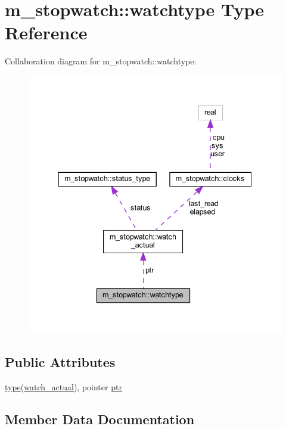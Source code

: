 \hypertarget{structm__stopwatch_1_1watchtype}{}\section{m\+\_\+stopwatch\+:\+:watchtype Type Reference}
\label{structm__stopwatch_1_1watchtype}


Collaboration diagram for m\+\_\+stopwatch\+:\+:watchtype\+:
\nopagebreak
\begin{figure}[H]
\begin{center}
\leavevmode
\includegraphics[width=338pt]{structm__stopwatch_1_1watchtype__coll__graph}
\end{center}
\end{figure}
\subsection*{Public Attributes}
\begin{DoxyCompactItemize}
\item 
\hyperlink{stop__watch_83_8txt_a70f0ead91c32e25323c03265aa302c1c}{type}(\hyperlink{structm__stopwatch_1_1watch__actual}{watch\+\_\+actual}), pointer \hyperlink{structm__stopwatch_1_1watchtype_abfd188f9a27ba289e623148a1bc1ddfa}{ptr}
\end{DoxyCompactItemize}


\subsection{Member Data Documentation}
\mbox{\label{structm__stopwatch_1_1watchtype_abfd188f9a27ba289e623148a1bc1ddfa}} 
